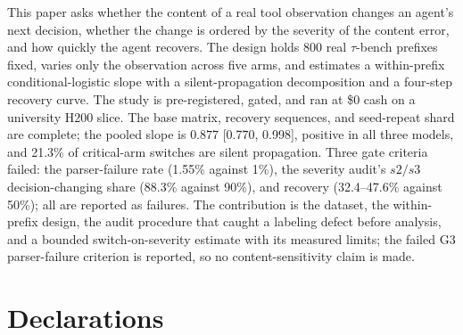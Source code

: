 \documentclass[a4paper,fleqn]{cas-sc}
\begin{document}
This paper asks whether the content of a real tool observation changes an agent's next decision,
whether the change is ordered by the severity of the content error, and how quickly the agent
recovers. The design holds 800 real $\tau$-bench prefixes fixed, varies only the observation across
five arms, and estimates a within-prefix conditional-logistic slope with a silent-propagation
decomposition and a four-step recovery curve. The study is pre-registered, gated, and ran at \$0
cash on a university H200 slice. The base matrix, recovery sequences, and seed-repeat shard are
complete; the pooled slope is $0.877$ [0.770, 0.998], positive in all three models, and 21.3\% of
critical-arm switches are silent propagation. Three gate criteria failed: the parser-failure rate
(1.55\% against 1\%), the severity audit's $s2/s3$ decision-changing share (88.3\% against 90\%),
and recovery (32.4--47.6\% against 50\%); all are reported as failures. The
contribution is the dataset, the within-prefix design, the audit procedure that caught a labeling
defect before analysis, and a bounded switch-on-severity estimate with its measured limits; the
failed G3 parser-failure criterion is reported, so no content-sensitivity claim is made. \section*{Declarations}
\end{document}
